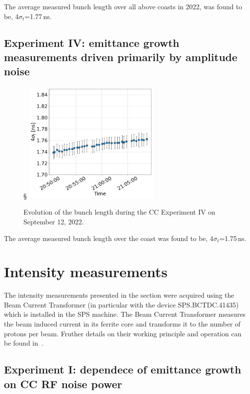 The average measured bunch length over all above coasts in 2022, was found to be, 4$\sigma_t$=1.77\,ns. 



\newpage

\subsection{Experiment IV: emittance growth measurements driven primarily by amplitude noise}\label{subsec:2022_exp4_bunch_length}

\begin{figure}[h]
    \centering         §
    \includegraphics[width=0.6\textwidth]{images/app_e/sps_cc_md_12sep_COAST_12.png}
        \caption{Evolution of the bunch length during the CC Experiment IV on September 12, 2022.}
        \label{fig:bunch_length_exp4}
 \end{figure}
 


The average measured bunch length over the coast was found to be, 4$\sigma_t$=1.75\,ns. 


\newpage
 \section{Intensity measurements}\label{sec:intensity_meas_2022}

 The intensity measurements presented in the section were acquired using the  Beam Current Transformer (in particular with the device SPS.BCTDC.41435) which is installed in the SPS machine. The Beam Current Transformer measures the beam induced current in its ferrite core and transforms it to the number of protons per beam. Fruther details on their working principle and operation can be found in~\cite{Jones:1982418, Jakob:624188}.  


 \subsection{Experiment I: dependece of emittance growth on CC RF noise power}\label{subsec:2022_exp1_intensity}

